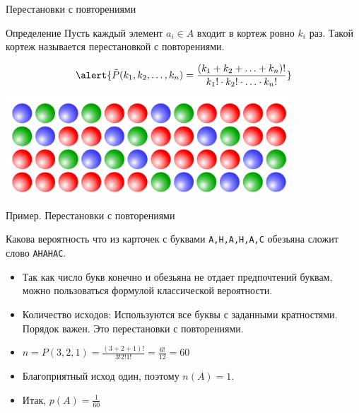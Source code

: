\documentclass[unicode,11pt,notheorems,xcolor=table]{beamer}
\begin{document}
\begin{frame}{Перестановки с повторениями} 
        \begin{block}{Определение}
        Пусть каждый  элемент $a_i\in A$ входит в кортеж ровно $k_i$ раз. Такой кортеж называется \alert{перестановкой с повторениями}.
    \end{block}
    $$
        \alert{\tilde{P}(k_1,k_2,\ldots, k_n) = \frac{(k_1+k_2+\ldots+ k_n)!}{k_1!\cdot k_2!\cdot \ldots \cdot k_n!}
        }
    $$
    
    \bigskip
    {\centering\includegraphics[width=0.8\textwidth]{permutations-2.png}\par}
\end{frame}
\begin{frame}{Пример. Перестановки с повторениями}
    \begin{exampleblock}{}
        Какова вероятность что из карточек с буквами \texttt{А,Н,А,Н,А,С} обезьяна сложит слово \texttt{АНАНАС}.
    \end{exampleblock}
    \begin{itemize}
        \item Так как число букв конечно и обезьяна не отдает предпочтений буквам, можно пользоваться формулой классической вероятности. 
        \item Количество исходов: Используются все буквы с заданными кратностями. Порядок важен. Это перестановки с повторениями.
        \item $n=P(3,2,1) = \frac{(3+2+1)!}{3!2!1!}=\frac{6!}{12}=60$
        \item Благоприятный исход один, поэтому $n(A)=1$.
        
        \item Итак,  \alert{$p(A)= \frac{1}{60}$}
    \end{itemize}    
\end{frame}
\end{document}
